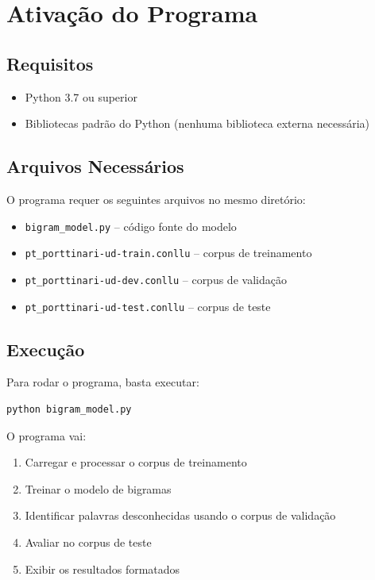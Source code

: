 \documentclass[12pt,a4paper]{article}
\begin{document}
\section{Ativação do Programa}

\subsection{Requisitos}

\begin{itemize}
    \item Python 3.7 ou superior
    \item Bibliotecas padrão do Python (nenhuma biblioteca externa necessária)
\end{itemize}

\subsection{Arquivos Necessários}

O programa requer os seguintes arquivos no mesmo diretório:
\begin{itemize}
    \item \texttt{bigram\_model.py} -- código fonte do modelo
    \item \texttt{pt\_porttinari-ud-train.conllu} -- corpus de treinamento
    \item \texttt{pt\_porttinari-ud-dev.conllu} -- corpus de validação
    \item \texttt{pt\_porttinari-ud-test.conllu} -- corpus de teste
\end{itemize}

\subsection{Execução}

Para rodar o programa, basta executar:

\begin{lstlisting}[language=bash]
python bigram_model.py
\end{lstlisting}

O programa vai:
\begin{enumerate}
    \item Carregar e processar o corpus de treinamento
    \item Treinar o modelo de bigramas
    \item Identificar palavras desconhecidas usando o corpus de validação
    \item Avaliar no corpus de teste
    \item Exibir os resultados formatados
\end{enumerate}
\end{document}
